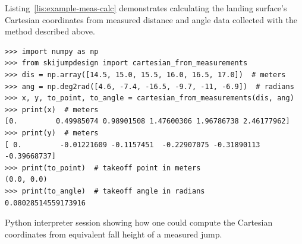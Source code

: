 \documentclass[smallextended]{svjour3}       %
\begin{document}
Listing~\ref{lis:example-meas-calc} demonstrates calculating the landing
surface's Cartesian coordinates from measured distance and angle data collected
with the method described above.
%
\begin{listing*}
  \begin{verbatim}
>>> import numpy as np
>>> from skijumpdesign import cartesian_from_measurements
>>> dis = np.array([14.5, 15.0, 15.5, 16.0, 16.5, 17.0])  # meters
>>> ang = np.deg2rad([4.6, -7.4, -16.5, -9.7, -11, -6.9])  # radians
>>> x, y, to_point, to_angle = cartesian_from_measurements(dis, ang)
>>> print(x)  # meters
[0.         0.49985074 0.98901508 1.47600306 1.96786738 2.46177962]
>>> print(y)  # meters
[ 0.         -0.01221609 -0.1157451  -0.22907075 -0.31890113 -0.39668737]
>>> print(to_point)  # takeoff point in meters
(0.0, 0.0)
>>> print(to_angle)  # takeoff angle in radians
0.08028514559173916
  \end{verbatim}
  \caption{Python interpreter session showing how one could compute the
  Cartesian coordinates from equivalent fall height of a measured jump.}
  \label{lis:example-meas-calc}
\end{listing*}
\end{document}
